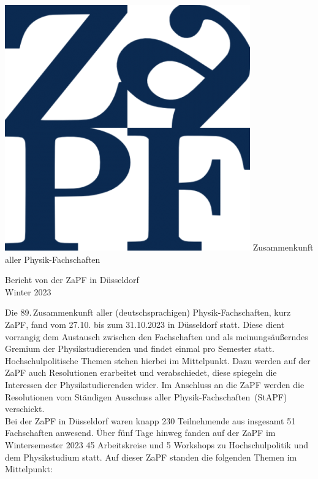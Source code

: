 \documentclass{scrartcl}
\begin{document}
\hspace{0.74\textwidth}
\begin{minipage}{0.25\textwidth}
      \vspace{-1cm}
      \centering
      \includegraphics[width=.89\textwidth]{logo.png}
      \small Zusammenkunft aller Physik-Fachschaften
\end{minipage}

\begin{center}
      \vspace{1.5cm}
      \huge{Bericht von der ZaPF in Düsseldorf \\ Winter 2023}
      \vspace{1cm}
\end{center}

Die 89.\,Zusammenkunft aller (deutschsprachigen) Physik-Fachschaften, kurz ZaPF, fand vom 27.10. bis zum 31.10.2023 in Düsseldorf statt. Diese dient vorrangig dem Austausch zwischen den Fachschaften und als meinungsäußerndes Gremium der Physikstudierenden und findet einmal pro Semester statt. Hochschulpolitische Themen stehen hierbei im Mittelpunkt. Dazu werden auf der ZaPF auch Resolutionen erarbeitet und verabschiedet, diese spiegeln die Interessen der Physikstudierenden wider. Im Anschluss an die ZaPF werden die Resolutionen vom Ständigen Ausschuss aller Physik-Fachschaften~(StAPF) verschickt.\\ 
Bei der ZaPF in Düsseldorf waren knapp 230 Teilnehmende aus insgesamt 51 Fachschaften anwesend.
Über fünf Tage hinweg fanden auf der ZaPF im Wintersemester 2023 45 Arbeitskreise und 5 Workshops zu Hochschulpolitik und dem Physikstudium statt. Auf dieser ZaPF standen die folgenden Themen im Mittelpunkt:
\end{document}
